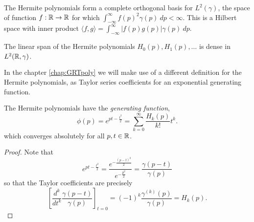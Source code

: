 
The Hermite polynomials form a complete orthogonal basis for $L^2(\gamma)$, the space of function $f : \mathbb{R} \to \mathbb{R}$ for which $\int_{-\infty}^\infty f(p)^2 \gamma(p)~dp < \infty$. This is a Hilbert space with inner product $\langle f, g \rangle = \int_{-\infty}^\infty |f(p)g(p)| \gamma(p)~dp$.

\begin{proposition}
   The linear span of the Hermite polynomials $H_0(p), H_1(p), \ldots$ is dense in $L^2(\mathbb{R}, \gamma)$.
\end{proposition}





In the chapter \ref{chap:GRTpoly} we will make use of a different definition for the Hermite polynomials, as Taylor series coefficients for an exponential generating function.
\begin{lemma}
  The Hermite polynomials have the \emph{generating function},
  \[
    \phi(p) = e^{pt - \frac{t^2}2} 
      = \sum_{k = 0}^\infty \frac{H_k(p)}{k!}t^k.
  \]
  which converges absolutely for all $p, t \in \mathbb{R}$.
\end{lemma}

\begin{proof}
Note that
\[
  e^{pt - \frac{t^2}2} 
    = \frac{e^{-\frac{(p-t)^2}2}}{e^{-\frac{p^2}2}} 
    = \frac{\gamma(p - t)}{\gamma(p)}
\]
so that the Taylor coefficients are precisely
\[
  \left[\frac{d^k}{dt^k}\frac{\gamma(p - t)}{\gamma(p)}\right]_{t = 0} 
    = (-1)^k \frac{\gamma^{(k)}(p)}{\gamma(p)} = H_k(p).
\]
\end{proof}

